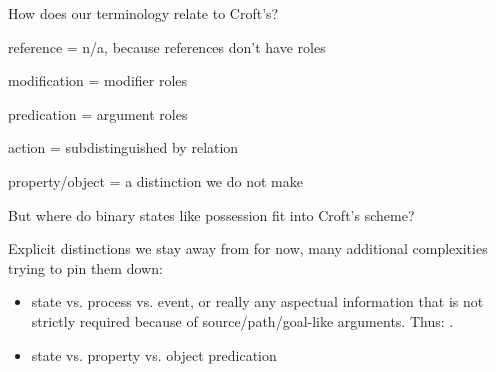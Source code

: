 \documentclass[a4paper]{article}
\begin{document}
How does our terminology relate to Croft's?

reference = n/a, because references don't have roles

modification = modifier roles

predication = argument roles

action = subdistinguished by relation

property/object = a distinction we do not make

But where do binary states like possession fit into Croft's scheme?

Explicit distinctions we stay away from for now, many additional complexities
trying to pin them down:

\begin{itemize}
    \item state vs. process vs. event, or really any aspectual information that
        is not strictly required because of source/path/goal-like arguments.
        Thus: .
    \item state vs. property vs. object predication
\end{itemize}

\clearpage



\end{document}
